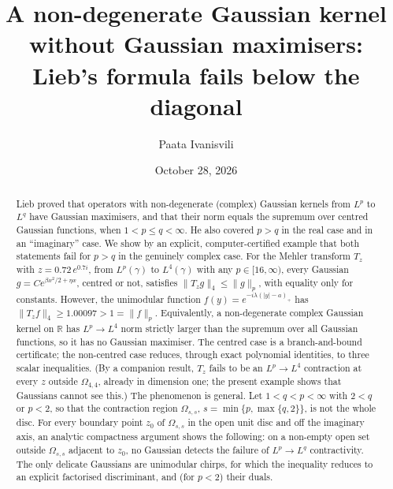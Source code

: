 \documentclass[11pt]{amsart}
\title[Gaussian maximisers fail below the diagonal]{A non-degenerate Gaussian kernel without Gaussian
maximisers:\\ Lieb's formula fails below the diagonal}
\author{Paata Ivanisvili}
\date{October 28, 2026}
\theoremstyle{definition}
\newcommand{\R}{\mathbb{R}}
\begin{document}
\sloppy
\begin{abstract}
Lieb proved that operators with non-degenerate (complex) Gaussian kernels from $L^p$ to $L^q$ have Gaussian
maximisers, and that their norm equals the supremum over centred Gaussian functions, when $1<p\le q<\infty$.
He also covered $p>q$ in the real case and in an ``imaginary'' case. We show by an explicit, computer-certified
example that both statements fail for $p>q$ in the genuinely complex case. For the Mehler transform $T_z$ with
$z=0.72\,e^{0.7i}$, from $L^p(\gamma)$ to $L^4(\gamma)$ with any $p\in[16,\infty)$, every Gaussian
$g=C e^{\beta x^2/2+\eta x}$, centred or not, satisfies $\|T_zg\|_4\le\|g\|_p$, with equality only for constants.
However, the unimodular function $f(y)=e^{-i\lambda(|y|-a)_+}$ has $\|T_zf\|_4\ge1.00097>1=\|f\|_p$. Equivalently, a
non-degenerate complex Gaussian kernel on $\R$ has $L^p\to L^4$ norm strictly larger than the supremum over all
Gaussian functions, so it has no Gaussian maximiser. The centred case is a branch-and-bound certificate; the
non-centred case reduces, through exact polynomial identities, to three scalar inequalities. (By a companion result, $T_z$ fails to be an $L^p\to L^4$ contraction at every $z$
outside $\Omega_{4,4}$, already in dimension one; the present example shows that Gaussians cannot see this.)
The phenomenon is general. Let $1<q<p<\infty$ with $2<q$ or $p<2$, so that the contraction region $\Omega_{s,s}$,
$s=\min\{p,\max\{q,2\}\}$, is not the whole disc. For every boundary point $z_0$ of $\Omega_{s,s}$ in the open unit
disc and off the imaginary axis, an analytic compactness argument shows the following: on a non-empty open set outside $\Omega_{s,s}$ adjacent
to $z_0$, no Gaussian detects the failure of $L^p\to L^q$ contractivity. The only delicate Gaussians are unimodular
chirps, for which the inequality reduces to an explicit factorised discriminant, and (for $p<2$) their duals.
\end{abstract}
\makeatletter
\let\aidisc@setabstracta\@setabstracta
\def\@setabstracta{\par\vskip 10pt{\centering\small\itshape
This proof was generated on October 28, 2026, by Grok Bot using Cursor’s agents, guided by several prompts from Paata Ivanisvili
\par}\aidisc@setabstracta}
\makeatother
\maketitle
\end{document}
